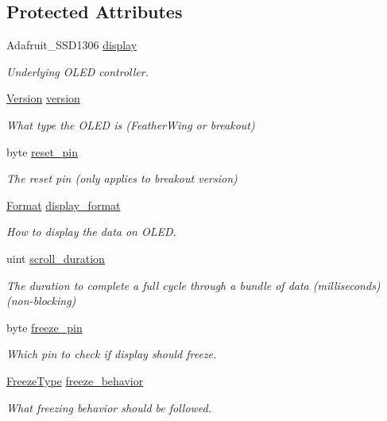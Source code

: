 \subsection*{Protected Attributes}
\begin{DoxyCompactItemize}
\item 
Adafruit\+\_\+\+S\+S\+D1306 \hyperlink{class_loom___o_l_e_d_a0cc78f1f1fd95a4c3d16fe32c9d33499}{display}
\begin{DoxyCompactList}\small\item\em Underlying O\+L\+ED controller. \end{DoxyCompactList}\item 
\hyperlink{class_loom___o_l_e_d_aaf40c7e29901e7130f86046a26cb7400}{Version} \hyperlink{class_loom___o_l_e_d_af0bc56c14688195fed9cafb74601bec3}{version}
\begin{DoxyCompactList}\small\item\em What type the O\+L\+ED is (Feather\+Wing or breakout) \end{DoxyCompactList}\item 
byte \hyperlink{class_loom___o_l_e_d_a8962f61e0211d70d1d1de489d1d6bbfa}{reset\+\_\+pin}
\begin{DoxyCompactList}\small\item\em The reset pin (only applies to breakout version) \end{DoxyCompactList}\item 
\hyperlink{class_loom___o_l_e_d_aade282dab7eb118271f73b3b3bfc0ffd}{Format} \hyperlink{class_loom___o_l_e_d_a1cfdc8965297ea1f697d8a4d3e44b5fd}{display\+\_\+format}
\begin{DoxyCompactList}\small\item\em How to display the data on O\+L\+ED. \end{DoxyCompactList}\item 
uint \hyperlink{class_loom___o_l_e_d_ad6893fc088b080440f2f1d5d6f84d461}{scroll\+\_\+duration}
\begin{DoxyCompactList}\small\item\em The duration to complete a full cycle through a bundle of data (milliseconds)(non-\/blocking) \end{DoxyCompactList}\item 
byte \hyperlink{class_loom___o_l_e_d_a693dc20156729cb7d06e877247e914d0}{freeze\+\_\+pin}
\begin{DoxyCompactList}\small\item\em Which pin to check if display should freeze. \end{DoxyCompactList}\item 
\hyperlink{class_loom___o_l_e_d_adedc20c1c901fe472d976c722abf0bb9}{Freeze\+Type} \hyperlink{class_loom___o_l_e_d_aafea3f7f393170a4cc7c5e7ff8583344}{freeze\+\_\+behavior}
\begin{DoxyCompactList}\small\item\em What \textquotesingle{}freezing\textquotesingle{} behavior should be followed. \end{DoxyCompactList}\end{DoxyCompactItemize}
